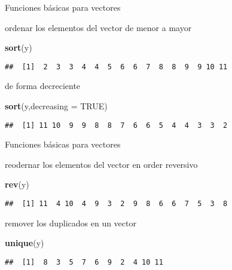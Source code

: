 \documentclass[ignorenonframetext,]{beamer}
\newenvironment{Shaded}{\begin{snugshade}}{\end{snugshade}}
\newcommand{\KeywordTok}[1]{\textcolor[rgb]{0.13,0.29,0.53}{\textbf{#1}}}
\newcommand{\DataTypeTok}[1]{\textcolor[rgb]{0.13,0.29,0.53}{#1}}
\newcommand{\OtherTok}[1]{\textcolor[rgb]{0.56,0.35,0.01}{#1}}
\newcommand{\NormalTok}[1]{#1}
\begin{document}
\begin{frame}[fragile]{Funciones básicas para vectores}

ordenar los elementos del vector de menor a mayor

\begin{Shaded}
\begin{Highlighting}[]
\KeywordTok{sort}\NormalTok{(y)}
\end{Highlighting}
\end{Shaded}

\begin{verbatim}
##  [1]  2  3  3  4  4  5  6  6  7  8  8  9  9 10 11
\end{verbatim}

de forma decreciente

\begin{Shaded}
\begin{Highlighting}[]
\KeywordTok{sort}\NormalTok{(y,}\DataTypeTok{decreasing =} \OtherTok{TRUE}\NormalTok{)}
\end{Highlighting}
\end{Shaded}

\begin{verbatim}
##  [1] 11 10  9  9  8  8  7  6  6  5  4  4  3  3  2
\end{verbatim}

\end{frame}

\begin{frame}[fragile]{Funciones básicas para vectores}

reodernar los elementos del vector en order reversivo

\begin{Shaded}
\begin{Highlighting}[]
\KeywordTok{rev}\NormalTok{(y)}
\end{Highlighting}
\end{Shaded}

\begin{verbatim}
##  [1] 11  4 10  4  9  3  2  9  8  6  6  7  5  3  8
\end{verbatim}

remover los duplicados en un vector

\begin{Shaded}
\begin{Highlighting}[]
\KeywordTok{unique}\NormalTok{(y)}
\end{Highlighting}
\end{Shaded}

\begin{verbatim}
##  [1]  8  3  5  7  6  9  2  4 10 11
\end{verbatim}

\end{frame}
\end{document}
